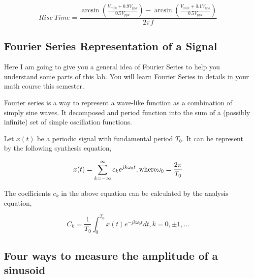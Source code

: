 \documentclass{article}
\begin{document}
$$Rise\ Time=\frac{\arcsin\left(\frac{V_{min}+0.9V_{ppk}}{0.5V_{ppk}}\right)-\arcsin\left(\frac{V_{min}+0.1V_{ppk}}{0.5V_{ppk}}\right)}{2\pi f}$$


\subsection{Fourier Series Representation of a Signal}

Here I am going to give you a general idea of Fourier Series to help you
understand some parts of this lab. You will learn Fourier Series in details in your
math course this semester.

Fourier series is a way to represent a wave-like function as a combination of
simply sine waves. It decomposed and period function into the sum of a (possibly
infinite) set of simple oscillation functions.

Let $x(t)$ be a periodic signal with fundamental period $T_0$. It can be represent by the following synthesis equation,

$$x(t)=\sum_{k=-\infty}^{\infty}c_ke^{jk\omega_0t}, {\rm where} \omega_0=\frac{2\pi}{T_0}$$

The coefficients $c_k$ in the above equation can be calculated by the analysis
equation,

$$C_k=\frac{1}{T_0}\int_0^{T_0}x(t)e^{-jk\omega_0t}dt,k=0,\pm 1,...$$

\subsection{Four ways to measure the amplitude of a sinusoid}
\end{document}
